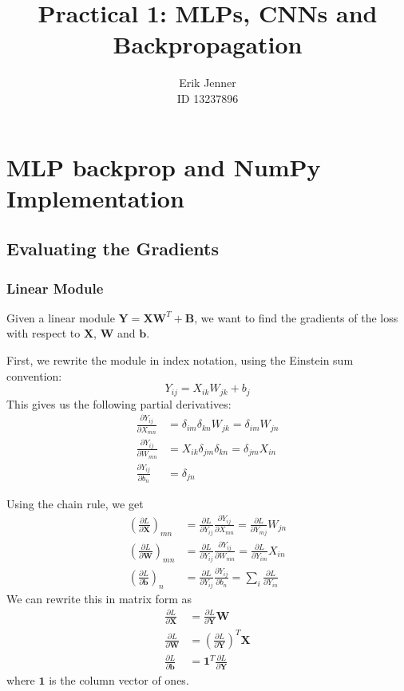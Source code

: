 \documentclass{article}
\title{Practical 1: MLPs, CNNs and Backpropagation}
\author{%
  Erik Jenner\\
  ID 13237896
}
\newcommand{\pd}[2]{\frac{\partial #1}{\partial #2}}
\begin{document}

\maketitle

\section{MLP backprop and NumPy Implementation}
\subsection{Evaluating the Gradients}
\subsubsection{Linear Module}
Given a linear module \(\bm Y = \bm X \bm W^T + \bm B\), we want to find the gradients
of the loss with respect to \(\bm X\), \(\bm W\) and \(\bm b\).

First, we rewrite the module in index notation, using the Einstein sum convention:
\[Y_{ij} = X_{ik}W_{jk} + b_j\]
This gives us the following partial derivatives:
\begin{align*}
  \pd{Y_{ij}}{X_{mn}} &= \delta_{im}\delta_{kn}W_{jk} = \delta_{im}W_{jn}\\
  \pd{Y_{ij}}{W_{mn}} &= X_{ik}\delta_{jm}\delta_{kn} = \delta_{jm}X_{in}\\
  \pd{Y_{ij}}{b_n} &= \delta_{jn}
\end{align*}

Using the chain rule, we get
\begin{align*}
\left(\pd{L}{\bm X}\right)_{mn} &= \pd{L}{Y_{ij}} \pd{Y_{ij}}{X_{mn}} = \pd{L}{Y_{mj}}W_{jn}\\
\left(\pd{L}{\bm W}\right)_{mn} &= \pd{L}{Y_{ij}} \pd{Y_{ij}}{W_{mn}} = \pd{L}{Y_{im}}X_{in}\\
\left(\pd{L}{\bm b}\right)_n &= \pd{L}{Y_{ij}} \pd{Y_{ij}}{b_n} = \sum_{i} \pd{L}{Y_{in}}
\end{align*}
We can rewrite this in matrix form as
\begin{align*}
\pd{L}{\bm X} &= \pd{L}{\bm Y} \bm W\\
\pd{L}{\bm W} &= \left(\pd{L}{\bm Y}\right)^T \bm X\\
\pd{L}{\bm b} &= \bm 1^T \pd{L}{\bm Y}
\end{align*}
where \(\bm 1\) is the column vector of ones.
\end{document}
